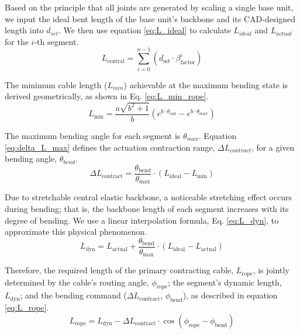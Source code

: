 \documentclass[conference]{IEEEtran}
\begin{document}
Based on the principle that all joints are generated by scaling a single base unit, we input the ideal bent length of the base unit's backbone and its CAD-designed length into $d_{set}$. We then use equation \eqref{eq:L_ideal} to calculate $L_{ideal}$ and $L_{actual}$ for the $i$-th segment.
\begin{equation}
    L_{\text{central}} = \sum_{i=0}^{n-1} \left( d_{\text{set}} \cdot \beta_{\text{factor}}^i \right)
    \label{eq:L_ideal}
\end{equation}

The minimum cable length ($L_{min}$) achievable at the maximum bending state is derived geometrically, as shown in Eq. \eqref{eq:L_min_rope}.
\begin{equation}
    L_{\text{min}} = \frac{a\sqrt{b^2 + 1}}{b} \left( e^{b \cdot \theta_{\text{end}}} - e^{b \cdot \theta_{\text{start}}} \right)
    \label{eq:L_min_rope}
\end{equation}

The maximum bending angle for each segment is $\theta_{max}$. Equation \eqref{eq:delta_L_max} defines the actuation contraction range, $\Delta L_{contract}$, for a given bending angle, $\theta_{bend}$.
\begin{equation}
    \Delta L_{\text{contract}} = \frac{\theta_{\text{bend}}}{\theta_{\text{max}}} \cdot \left( L_{\text{ideal}} - L_{\text{min}} \right)
    \label{eq:delta_L_max}
\end{equation}

Due to stretchable central elastic backbone, a noticeable stretching effect occurs during bending; that is, the backbone length of each segment increases with its degree of bending. We use a linear interpolation formula, Eq. \eqref{eq:L_dyn}, to approximate this physical phenomenon.
\begin{equation}
    L_{\text{dyn}} = L_{\text{actual}} + \frac{\theta_{\text{bend}}}{\theta_{\text{max}}} \cdot \left( L_{\text{ideal}} - L_{\text{actual}} \right)
    \label{eq:L_dyn}
\end{equation}

Therefore, the required length of the primary contracting cable, $L_{\text{rope}}$, is jointly determined by the cable's routing angle, $\phi_{\text{rope}}$; the segment's dynamic length, $L_{\text{dyn}}$; and the bending command ($\Delta L_{\text{contract}}$, $\phi_{\text{bend}}$), as described in equation \eqref{eq:L_rope}.
\begin{equation}
    L_{\text{rope}} = L_{\text{dyn}} - \Delta L_{\text{contract}} \cdot \cos(\phi_{\text{rope}} - \phi_{\text{bend}})
    \label{eq:L_rope}
\end{equation}
\end{document}
